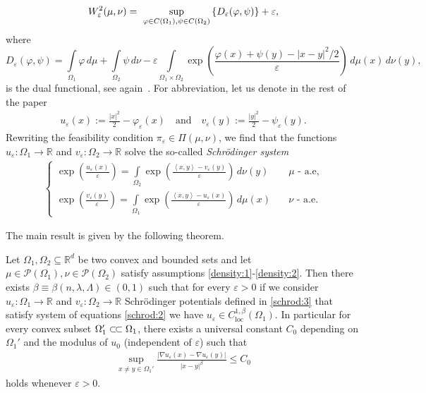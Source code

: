 \documentclass[reqno,12pt]{article}
\DeclareMathOperator{\loc}{loc}
\newcommand{\R}{\mathbb{R}}
\newcommand{\inner}[2]{\left\langle #1, #2 \right\rangle}
\newcommand{\I}{\int\limits}
\newcommand{\ssubset}{\subset\joinrel\subset}
\begin{document}
\begin{align*}
    W_{\varepsilon}^{2}(\mu,\nu) = 
    \notag\
     \sup\limits_{\varphi\in C(\Omega_{1}),\psi\in C(\Omega_{2})} 
    \left\{ D_{\varepsilon}(\varphi,\psi)\right\}  + \varepsilon ,
\end{align*}
where 
\[
D_{\varepsilon}(\varphi,\psi) = \I_{\Omega_{1}}\varphi\,d\mu + \I_{\Omega_{2}}\psi\,d\nu -\varepsilon \I_{\Omega_{1}\times \Omega_{2}} \exp\left( \frac{\varphi(x)+\psi(y)-|x-y|^2/2}{\varepsilon} \right)\,d\mu(x)\,d\nu(y),
\]
is the dual functional, see again~\cite{DG20, LeoSurvey}. For abbreviation, let us denote in the rest of the paper 
\begin{align}
    \label{schrod:3}
    u_{\varepsilon}(x):= \frac{|x|^2}{2}-\varphi_{\varepsilon}(x)
    \quad\text{and}\quad
    v_{\varepsilon}(y):= \frac{|y|^2}{2}-\psi_{\varepsilon}(y).
\end{align}
Rewriting the feasibility condition $\pi_{\varepsilon}\in\Pi(\mu,\nu)$, we find that the functions $u_{\varepsilon} : \Omega_1\rightarrow \R$ and $v_{\varepsilon}: \Omega_2\rightarrow \R$ solve the so-called \textit{Schr\"odinger system} %
\begin{align}
    \label{schrod:2}
    \left\{
    \begin{array}{lr}
        \displaystyle \exp\left(\frac{u_{\varepsilon}(x)}{\varepsilon}\right) = \I_{\Omega_2} \exp\left(\frac{\inner{x}{y}-v_{\varepsilon}(y)}{\varepsilon}\right)\,d\nu(y) 
        &\quad \mu \text{ - a.e,} \\
        \displaystyle \exp\left(\frac{v_{\varepsilon}(y)}{\varepsilon}\right) = \I_{\Omega_1} \exp\left(\frac{\inner{x}{y}-u_{\varepsilon}(x)}{\varepsilon}\right)\,d\mu(x) 
        &\quad \nu \text{ - a.e.}
    \end{array}
    \right.
\end{align}


The main result is given by the following theorem.

\begin{teo}
    \label{thm:main}
    Let $\Omega_1, \Omega_2 \subseteq \R^d$ be two convex and bounded sets and let $\mu \in \mathcal{P}(\Omega_1), \nu \in \mathcal{P}(\Omega_2)$ satisfy assumptions \eqref{density:1}-\eqref{density:2}. Then there exists $\beta\equiv \beta(n,\lambda,\Lambda)\in (0,1)$ such that for every $\varepsilon >0$ if we consider $u_{\varepsilon} : \Omega_1\rightarrow \R$ and $v_{\varepsilon} : \Omega_2 \rightarrow \R$ Schr\"odinger potentials defined in \eqref{schrod:3} that satisfy system of equations \eqref{schrod:2} we have $u_{\varepsilon}\in C^{1,\beta}_{\loc}(\Omega_{1})$. In particular for every convex subset $\Omega_{1}'\ssubset \Omega_1$, there exists a universal constant $C_{0}$ depending on $\Omega_{1}'$ and the modulus of $u_0$ (independent of $\varepsilon$) such that 
    \begin{align*}
        \sup\limits_{x\neq y \in \Omega_{1}'} \frac{|\nabla u_{\varepsilon}(x)-\nabla u_{\varepsilon}(y)|}{|x-y|^{\beta}} \leqslant C_0
    \end{align*}
    holds whenever $\varepsilon>0$. 
\end{teo}
\end{document}
